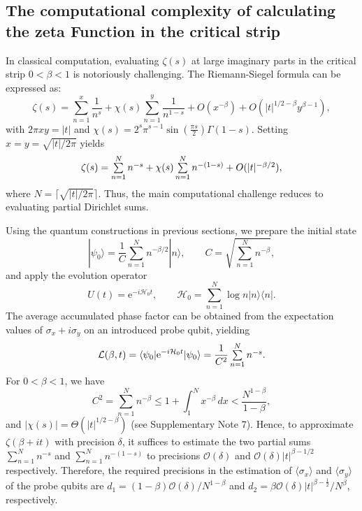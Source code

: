 \documentclass[aps,pra,twocolumn,superscriptaddress,preprintnumbers,amsmath,amssymb]{revtex4-2}
\begin{document}
\subsection{The computational complexity of calculating the  zeta Function in the critical strip}\label{Methods:complexity}
In classical computation, evaluating $\zeta(s)$ at  large imaginary parts in the critical strip $0<\beta<1$ is notoriously challenging.  
The Riemann-Siegel formula can be expressed as: 
\[
    \zeta(s)=\textstyle\sum\limits_{n=1}^{x}\frac{1}{n^s}+\chi(s)\textstyle\sum\limits_{n=1}^{y}\frac{1}{n^{1-s}}+O(x^{-\beta})+O(|t|^{1/2-\beta}y^{\beta-1}),
\]
with $2\pi xy=|t|$ and $\chi(s)=2^s\pi^{s-1}\sin(\tfrac{\pi s}{2})\Gamma(1-s)$. Setting $x=y=\sqrt{|t|/2\pi}$ yields
\begin{equation}
    \zeta(s)=\textstyle\sum\limits_{n=1}^{N}\limits n^{-s}+\chi(s)\textstyle\sum\limits_{n=1}^{N}n^{-(1-s)}+O(|t|^{-\beta/2}),
\end{equation}
where $N=\lceil\sqrt{|t|/2\pi}\rceil$. Thus, the main computational challenge reduces to evaluating partial Dirichlet sums.\par
Using the quantum constructions in previous sections, we prepare the initial state 
\begin{equation}
        |\psi_0\rangle=\frac{1}{C}\textstyle\sum\limits_{n=1}^{N}n^{-\beta/2}|n\rangle, \qquad C=\sqrt{\textstyle\sum\limits_{n=1}^{N}n^{-\beta}},
    \end{equation} 
  and apply the evolution operator 
  \begin{equation}
        U(t)=\mathrm{e}^{-i\mathcal{H}_0t}, \qquad \mathcal{H}_0=\sum\limits_{n=1}^{N}\log n|n\rangle\langle n|.
    \end{equation}
    The average accumulated phase factor can be obtained from
    the expectation values of $\sigma_x + i\sigma_y$ on an introduced probe qubit, yielding
    \begin{equation}
    {\cal L}(\beta,t)=\langle \psi_0|\mathrm{e}^{-i\mathcal{H}_0 t}|\psi_0\rangle=\frac{1}{C^{2}}\textstyle\sum\limits_{n=1}^{N}n^{-s}.
\end{equation}
For $0<\beta<1$, we have
\begin{equation}
C^2=\textstyle\sum\limits_{n=1}^{N} n^{-\beta}
\le 1 + \int_{1}^{N} x^{-\beta}\,dx<\frac{N^{1-\beta}}{1-\beta},
\end{equation} 
and $|\chi(s)|=\Theta(|t|^{1/2 - \beta})$ (see Supplementary Note 7).
Hence, to approximate $\zeta(\beta+it)$ with precision $\delta$, it suffices to estimate the two partial sums $\textstyle\sum_{n=1}^{N}n^{-s}$ and $\textstyle\sum_{n=1}^{N}n^{-(1-s)}$ to precisions $\mathcal{O}(\delta)$  and $\mathcal{O}(\delta)|t|^{\beta-1/2}$ respectively. Therefore, the required precisions in the estimation of  $\langle\sigma_x\rangle$  and $\langle \sigma_y \rangle$ of the probe qubits are $d_1=(1-\beta)\mathcal{O}(\delta)/N^{1-\beta}$ and $d_2=\beta\mathcal{O}(\delta)|t|^{\beta-\tfrac{1}{2}}/N^{\beta}$, respectively. 
\end{document}
